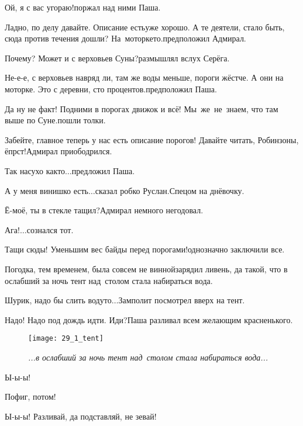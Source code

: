 \diagdash Ой, я с вас угораю!\mdash поржал над ними Паша.

\diagdash Ладно, по делу давайте. Описание есть\mdash уже хорошо. А те деятели, стало быть, сюда против течения дошли? На~моторке\sdash то.\mdash предположил Адмирал.

\diagdash Почему? Может и с верховьев Суны?\mdash размышлял вслух Серёга.

\diagdash Не-е-е, с верховьев навряд ли, там же воды меньше, пороги жёстче. А они на моторке. Это с деревни, сто процентов.\mdash предположил Паша.%

\diagdash Да ну не факт! Подними в порогах движок и всё! Мы~же~не~знаем, что там выше по Суне.\mdash пошли толки.

\diagdash Забейте, главное теперь у нас есть описание порогов! Давайте читать, Робинзоны, ёпрст!\mdash Адмирал приободрился.

\diagdash Так насухо как\sdash то$\ldots$\mdash предложил Паша.

\diagdash А у меня винишко есть$\ldots$\mdash сказал робко Руслан.\mdash Спецом на днёвочку.

\diagdash Ё-моё, ты в стекле тащил?\mdash Адмирал немного негодовал.

\diagdash Ага!$\ldots$\mdash сознался тот.

\diagdash Тащи сюды! Уменьшим вес байды перед порогами!\mdash однозначно заключили все.

Погодка, тем временем, была совсем не винной\mdash зарядил ливень, да такой, что в ослабший за ночь тент над~столом стала набираться вода.

\diagdash Шурик, надо бы слить воду\sdash то$\ldots$\mdash Замполит посмотрел вверх на тент.

\diagdash Надо! Надо под дождь идти. Иди?\mdash Паша разливал всем желающим красненького.

\begin{figure}[h]
	\centering
	\texttt{[image: 29\_1\_tent]}
	\caption{\small\textit{...в ослабший за ночь тент над~столом стала набираться вода...}}
\end{figure}

\diagdash Ы-ы-ы!

\diagdash Пофиг, потом!

\diagdash Ы-ы-ы! Разливай, да подставляй, не зевай!

